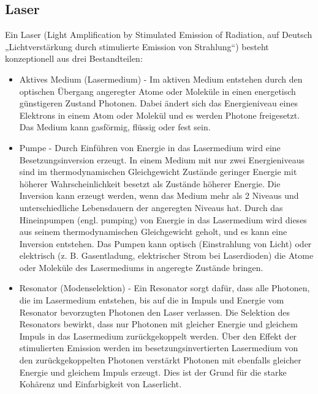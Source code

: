 \documentclass[a4paper,titlepage]{scrartcl}
\numberwithin{equation}{section}
\begin{document}
\subsection{Laser}
Ein Laser (Light Amplification by Stimulated Emission of Radiation, auf Deutsch „Lichtverstärkung durch stimulierte Emission von Strahlung“) besteht konzeptionell aus drei Bestandteilen:
\begin{itemize}
\item Aktives Medium (Lasermedium) - Im aktiven Medium entstehen durch den optischen Übergang angeregter Atome oder Moleküle in einen energetisch günstigeren Zustand Photonen. Dabei ändert sich das Energieniveau eines Elektrons in einem Atom oder Molekül und es werden Photone freigesetzt. Das Medium kann gasförmig, flüssig oder fest sein.
\item Pumpe - Durch Einführen von Energie in das Lasermedium wird eine Besetzungsinversion erzeugt. In einem Medium mit nur zwei Energieniveaus sind im thermodynamischen Gleichgewicht Zustände geringer Energie mit höherer Wahrscheinlichkeit besetzt als Zustände höherer Energie. Die Inversion kann erzeugt werden, wenn das Medium mehr als 2 Niveaus und unterschiedliche Lebensdauern der angeregten Niveaus hat. Durch das Hineinpumpen (engl. pumping) von Energie in das Lasermedium wird dieses aus seinem thermodynamischen Gleichgewicht geholt, und es kann eine Inversion entstehen. Das Pumpen kann optisch (Einstrahlung von Licht) oder elektrisch (z. B. Gasentladung, elektrischer Strom bei Laserdioden) die Atome oder Moleküle des Lasermediums in angeregte Zustände bringen.
\item Resonator (Modenselektion) - Ein Resonator sorgt dafür, dass alle Photonen, die im Lasermedium entstehen, bis auf die in Impuls und Energie vom Resonator bevorzugten Photonen den Laser verlassen. Die Selektion des Resonators bewirkt, dass nur Photonen mit gleicher Energie und gleichem Impuls in das Lasermedium zurückgekoppelt werden. Über den Effekt der stimulierten Emission werden im besetzungsinvertierten Lasermedium von den zurückgekoppelten Photonen verstärkt Photonen mit ebenfalls gleicher Energie und gleichem Impuls erzeugt. Dies ist der Grund für die starke Kohärenz und Einfarbigkeit von Laserlicht.
\end{itemize}
\end{document}
